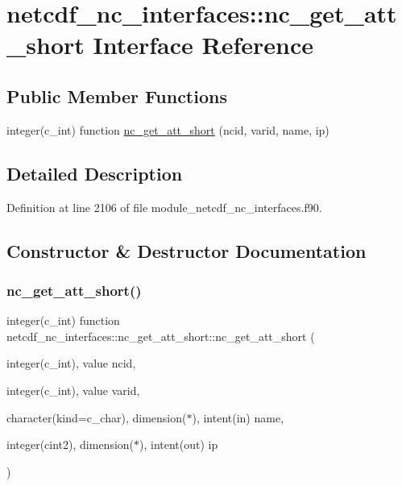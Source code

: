 \hypertarget{interfacenetcdf__nc__interfaces_1_1nc__get__att__short}{}\section{netcdf\+\_\+nc\+\_\+interfaces\+:\+:nc\+\_\+get\+\_\+att\+\_\+short Interface Reference}
\label{interfacenetcdf__nc__interfaces_1_1nc__get__att__short}
\subsection*{Public Member Functions}
\begin{DoxyCompactItemize}
\item 
integer(c\+\_\+int) function \hyperlink{interfacenetcdf__nc__interfaces_1_1nc__get__att__short_ae59435a8758ff452947a5ebb838aa3fb}{nc\+\_\+get\+\_\+att\+\_\+short} (ncid, varid, name, ip)
\end{DoxyCompactItemize}


\subsection{Detailed Description}


Definition at line 2106 of file module\+\_\+netcdf\+\_\+nc\+\_\+interfaces.\+f90.



\subsection{Constructor \& Destructor Documentation}
\mbox{\label{interfacenetcdf__nc__interfaces_1_1nc__get__att__short_ae59435a8758ff452947a5ebb838aa3fb}} 
\subsubsection{\texorpdfstring{nc\+\_\+get\+\_\+att\+\_\+short()}{nc\_get\_att\_short()}}
{\footnotesize\ttfamily integer(c\+\_\+int) function netcdf\+\_\+nc\+\_\+interfaces\+::nc\+\_\+get\+\_\+att\+\_\+short\+::nc\+\_\+get\+\_\+att\+\_\+short (\begin{DoxyParamCaption}\item[{integer(c\+\_\+int), value}]{ncid,  }\item[{integer(c\+\_\+int), value}]{varid,  }\item[{character(kind=c\+\_\+char), dimension($\ast$), intent(in)}]{name,  }\item[{integer(cint2), dimension($\ast$), intent(out)}]{ip }\end{DoxyParamCaption})}



